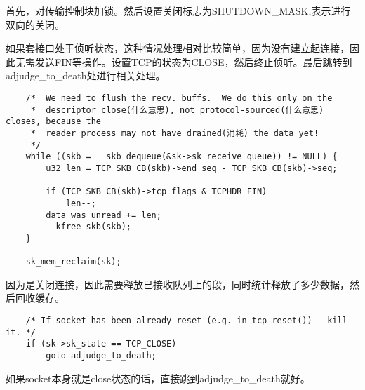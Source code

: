 		首先，对传输控制块加锁。然后设置关闭标志为SHUTDOWN\_MASK,表示进行双向的关闭。

		如果套接口处于侦听状态，这种情况处理相对比较简单，因为没有建立起连接，因此无需发送FIN等操作。设置TCP的状态为CLOSE，然后终止侦听。最后跳转到adjudge\_to\_death处进行相关处理。

\begin{verbatim}
	/*  We need to flush the recv. buffs.  We do this only on the
	 *  descriptor close(什么意思), not protocol-sourced(什么意思) closes, because the
	 *  reader process may not have drained(消耗) the data yet!
	 */
	while ((skb = __skb_dequeue(&sk->sk_receive_queue)) != NULL) {
		u32 len = TCP_SKB_CB(skb)->end_seq - TCP_SKB_CB(skb)->seq;

		if (TCP_SKB_CB(skb)->tcp_flags & TCPHDR_FIN)
			len--;
		data_was_unread += len;
		__kfree_skb(skb);
	}

	sk_mem_reclaim(sk);
\end{verbatim}

		因为是关闭连接，因此需要释放已接收队列上的段，同时统计释放了多少数据，然后回收缓存。

\begin{verbatim}
	/* If socket has been already reset (e.g. in tcp_reset()) - kill it. */
	if (sk->sk_state == TCP_CLOSE)
		goto adjudge_to_death;
\end{verbatim}

		如果socket本身就是close状态的话，直接跳到adjudge\_to\_death就好。

